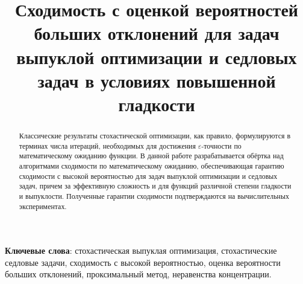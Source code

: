 
\usepackage[backend=biber, style=gost-numeric, sorting=none]{biblatex}
\usepackage{subfigure}



\theoremstyle{definition}
\newtheorem*{definition}{Определение}
\theoremstyle{plain}
\newtheorem{lemma}{Лемма}
\newtheorem{theorem}{Теорема}
\newtheorem{assumption}{Предположение}



\linespread{1.5}
\setlength{\parindent}{1.25cm}

\setcounter{page}{2}

\title{Сходимость с оценкой вероятностей больших отклонений для задач выпуклой оптимизации и седловых задач в условиях повышенной гладкости}

\date{}


	
	\hspace{0pt}
	\vfill
	\begin{center}
		\tableofcontents
	\end{center}
	\vfill
	\hspace{0pt}
	
	\newpage
	
	\hspace{0pt}
	\vfill
	
	\begin{abstract}
		
		Классические результаты стохастической оптимизации, как правило, формулируются в терминах числа итераций, необходимых для достижения $\varepsilon$-точности по математическому ожиданию функции. В данной работе разрабатывается обёртка над алгоритмами сходимости по математическому ожиданию, обеспечивающая гарантию сходимости с высокой вероятностью для задач выпуклой оптимизации и седловых задач, причем за эффективную сложность и для функций различной степени гладкости и выпуклости. Полученные гарантии сходимости подтверждаются на вычислительных экспериментах.
		
	\end{abstract}
	
	\textbf{Ключевые слова}: {\small стохастическая выпуклая оптимизация, стохастические седловые задачи, сходимость с высокой вероятностью, оценка вероятности больших отклонений, проксимальный метод, неравенства концентрации}.
	
